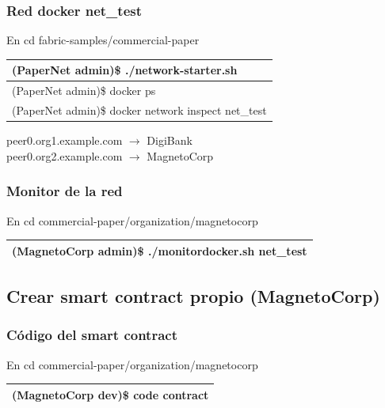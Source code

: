 \documentclass{beamer}
\begin{document}
	\begin{frame}
		\frametitle{Red docker net\_test}
		En cd fabric-samples/commercial-paper\\
		\begin{center}
			\begin{tabulary}{\linewidth}{L}
				\hline
				(PaperNet admin)\$ ./network-starter.sh \\
				\hline 
				(PaperNet admin)\$ docker ps \\
				\hline
				(PaperNet admin)\$ docker network inspect net\_test \\
				\hline
			\end{tabulary} 
		\end{center}
		peer0.org1.example.com $\rightarrow$ DigiBank\\
		peer0.org2.example.com $\rightarrow$ MagnetoCorp
	\end{frame}

	\begin{frame}
		\frametitle{Monitor de la red}
		En cd commercial-paper/organization/magnetocorp\\
		\begin{center}
			\begin{tabulary}{\linewidth}{L}
				\hline
				(MagnetoCorp admin)\$ ./monitordocker.sh net\_test \\
				\hline
			\end{tabulary} 
		\end{center}
	\end{frame}
	
	\subsection{Crear smart contract propio (MagnetoCorp)}
	
	\begin{frame}
		\frametitle{Código del smart contract}
		En cd commercial-paper/organization/magnetocorp\\
		\begin{center}
			\begin{tabulary}{\linewidth}{L}
				\hline
				(MagnetoCorp dev)\$ code contract \\
				\hline
			\end{tabulary} 
		\end{center}
	\end{frame}
\end{document}
